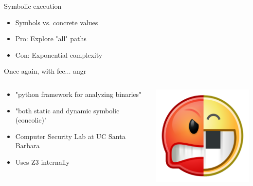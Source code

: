 \documentclass[10pt, compress, aspectratio=169]{beamer}
\begin{document}
\begin{frame}{Symbolic execution}
  \begin{itemize}
    \item Symbols vs. concrete values
    \item Pro: Explore "all" paths
    \item Con: Exponential complexity
  \end{itemize}
\end{frame}

\begin{frame}{Once again, with fee... angr}

	\begin{columns}
		\begin{column}{0.6\textwidth}
	
		\begin{itemize}
		\item "python framework for analyzing binaries"
		\item "both static and dynamic symbolic (concolic)"
		\item Computer Security Lab at UC Santa Barbara
		\item Uses Z3 internally
		\end{itemize}
	\end{column}
		\begin{column}{0.4\textwidth}
			\includegraphics[width=\textwidth]{images/angr-logo.png}
		\end{column}
	\end{columns}	

\end{frame}
\end{document}
